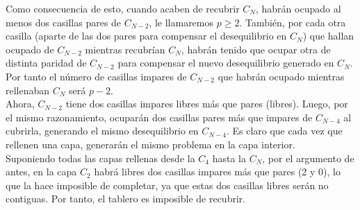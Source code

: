 \documentclass[12pt,spanish]{article}
\begin{document}
Como consecuencia de esto, cuando acaben de recubrir $C_N$, habrán
ocupado al menos dos casillas pares de $C_{N-2}$, le llamaremos
$p\geq 2$. También, por cada otra casilla (aparte de las dos pares
para compensar el desequilibrio en $C_N$) que hallan ocupado de
$C_{N-2}$ mientras recubrían $C_N$, habrán tenido que ocupar otra de
distinta paridad de $C_{N-2}$ para compensar el nuevo desequilibrio
generado en $C_N$. Por tanto el número de casillas impares de
$C_{N-2}$ que habrán ocupado mientras rellenaban $C_N$ será $p-2$. \\

Ahora, $C_{N-2}$ tiene dos casillas impares libres más que pares
(libres). Luego, por el mismo razonamiento, ocuparán dos casillas
pares más que impares de $C_{N-4}$ al cubrirla, generando el mismo
desequilibrio en $C_{N-4}$. Es claro que cada vez que rellenen una
capa, generarán el mismo problema en la capa interior. \\

Suponiendo todas las capas rellenas desde la $C_4$ hasta la $C_N$, por
el argumento de antes, en la capa $C_2$ habrá libres dos casillas
impares más que pares (2 y 0), lo que la hace imposible de completar,
ya que estas dos casillas libres serán no contiguas. Por tanto, el
tablero es imposible de recubrir.
\end{document}
